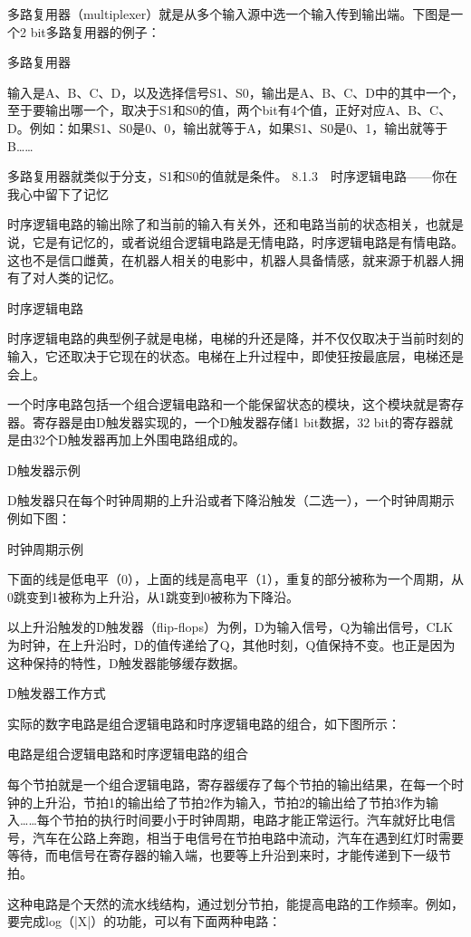 \documentclass[12pt,UTF8]{ctexbook}
\begin{document}
多路复用器（multiplexer）就是从多个输入源中选一个输入传到输出端。下图是一个2 bit多路复用器的例子：

多路复用器

输入是A、B、C、D，以及选择信号S1、S0，输出是A、B、C、D中的其中一个，至于要输出哪一个，取决于S1和S0的值，两个bit有4个值，正好对应A、B、C、D。例如：如果S1、S0是0、0，输出就等于A，如果S1、S0是0、1，输出就等于B……

多路复用器就类似于分支，S1和S0的值就是条件。
8.1.3　时序逻辑电路——你在我心中留下了记忆

时序逻辑电路的输出除了和当前的输入有关外，还和电路当前的状态相关，也就是说，它是有记忆的，或者说组合逻辑电路是无情电路，时序逻辑电路是有情电路。这也不是信口雌黄，在机器人相关的电影中，机器人具备情感，就来源于机器人拥有了对人类的记忆。

时序逻辑电路

时序逻辑电路的典型例子就是电梯，电梯的升还是降，并不仅仅取决于当前时刻的输入，它还取决于它现在的状态。电梯在上升过程中，即使狂按最底层，电梯还是会上。

一个时序电路包括一个组合逻辑电路和一个能保留状态的模块，这个模块就是寄存器。寄存器是由D触发器实现的，一个D触发器存储1 bit数据，32 bit的寄存器就是由32个D触发器再加上外围电路组成的。

D触发器示例

D触发器只在每个时钟周期的上升沿或者下降沿触发（二选一），一个时钟周期示例如下图：

时钟周期示例

下面的线是低电平（0），上面的线是高电平（1），重复的部分被称为一个周期，从0跳变到1被称为上升沿，从1跳变到0被称为下降沿。

以上升沿触发的D触发器（flip-flops）为例，D为输入信号，Q为输出信号，CLK为时钟，在上升沿时，D的值传递给了Q，其他时刻，Q值保持不变。也正是因为这种保持的特性，D触发器能够缓存数据。

D触发器工作方式

实际的数字电路是组合逻辑电路和时序逻辑电路的组合，如下图所示：

电路是组合逻辑电路和时序逻辑电路的组合

每个节拍就是一个组合逻辑电路，寄存器缓存了每个节拍的输出结果，在每一个时钟的上升沿，节拍1的输出给了节拍2作为输入，节拍2的输出给了节拍3作为输入……每个节拍的执行时间要小于时钟周期，电路才能正常运行。汽车就好比电信号，汽车在公路上奔跑，相当于电信号在节拍电路中流动，汽车在遇到红灯时需要等待，而电信号在寄存器的输入端，也要等上升沿到来时，才能传递到下一级节拍。

这种电路是个天然的流水线结构，通过划分节拍，能提高电路的工作频率。例如，要完成log（|X|）的功能，可以有下面两种电路：
\end{document}
